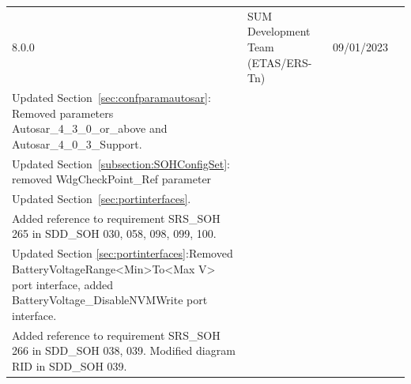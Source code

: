 \begin{longtable}{|l|l|l|l|}
\begin{minipage}{0.10\linewidth}\raggedright\vspace{.75ex}8.0.0\vspace{.75ex}\end{minipage} & \begin{minipage}{0.14\linewidth}\raggedright\vspace{.75ex}SUM Development Team (ETAS/ERS-Tn)\vspace{.75ex}\end{minipage} & \begin{minipage}{0.12\linewidth}\raggedright\vspace{.75ex}09/01/2023\vspace{.75ex}\end{minipage} & \begin{minipage}{0.51\linewidth}\raggedright\vspace{.75ex} Updated Section~\ref{subsec:wdgmreliabilitymonitor}. \\ Updated Section~\ref{sec:confparamautosar}: Removed parameters Autosar\_4\_3\_0\_or\_above and Autosar\_4\_0\_3\_Support. \\ Updated Section~\ref{subsection:SOHConfigSet}: removed WdgCheckPoint\_Ref parameter \\Updated Section~\ref{sec:portinterfaces}. \\ Added reference to requirement SRS\_SOH 265 in SDD\_SOH 030, 058, 098, 099, 100. \\ Updated Section \ref{sec:portinterfaces}:Removed BatteryVoltageRange<Min>To<Max V> port interface, added BatteryVoltage\_DisableNVMWrite port interface. \\ Added reference to requirement SRS\_SOH 266 in SDD\_SOH 038, 039. Modified diagram RID in SDD\_SOH 039.\vspace{.75ex}\end{minipage}\\\hline

\end{longtable}

